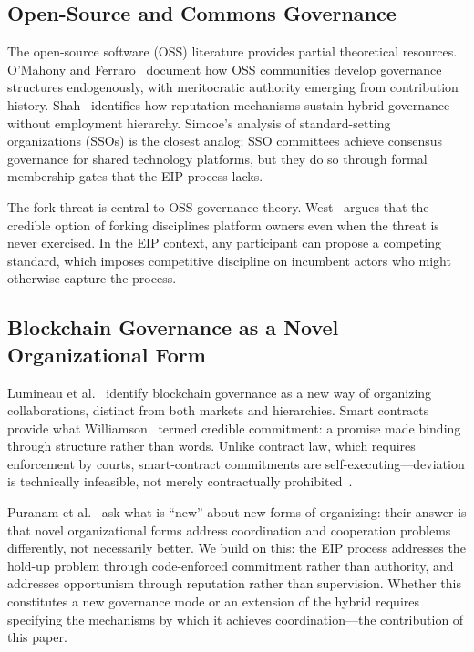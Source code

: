 \documentclass[conference]{IEEEtran}
\begin{document}
\subsection{Open-Source and Commons Governance}

The open-source software (OSS) literature provides partial theoretical
resources. O'Mahony and Ferraro~\cite{omahony2007} document how OSS communities
develop governance structures endogenously, with meritocratic authority emerging
from contribution history. Shah~\cite{shah2006} identifies how reputation
mechanisms sustain hybrid governance without employment hierarchy. Simcoe's
\cite{simcoe2012} analysis of standard-setting organizations (SSOs) is the
closest analog: SSO committees achieve consensus governance for shared technology
platforms, but they do so through formal membership gates that the EIP process
lacks.

The fork threat is central to OSS governance theory. West~\cite{west2003}
argues that the credible option of forking disciplines platform owners even
when the threat is never exercised. In the EIP context, any participant can
propose a competing standard, which imposes competitive discipline on
incumbent actors who might otherwise capture the process.

\subsection{Blockchain Governance as a Novel Organizational Form}

Lumineau et al.~\cite{lumineau2021} identify blockchain governance as a new
way of organizing collaborations, distinct from both markets and hierarchies.
Smart contracts provide what Williamson~\cite{williamson1983} termed credible
commitment: a promise made binding through structure rather than words. Unlike
contract law, which requires enforcement by courts, smart-contract commitments
are self-executing---deviation is technically infeasible, not merely
contractually prohibited~\cite{defilippi2018}.

Puranam et al.~\cite{puranam2014} ask what is ``new'' about new forms of
organizing: their answer is that novel organizational forms address
coordination and cooperation problems differently, not necessarily better.
We build on this: the EIP process addresses the hold-up problem through
code-enforced commitment rather than authority, and addresses opportunism
through reputation rather than supervision. Whether this constitutes a
new governance mode or an extension of the hybrid requires specifying the
mechanisms by which it achieves coordination---the contribution of this paper.
\end{document}
